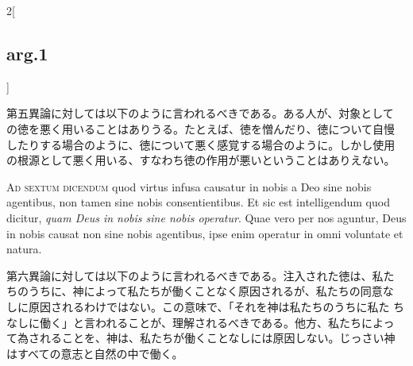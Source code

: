 \documentclass[paper=a4paper,fontsize=10pt,jafontsize=9pt,titlepage]{jlreq}
\begin{document}
\begin{paracol}{2}[\subsection{arg.1}]
\switchcolumn

第五異論に対しては以下のように言われるべきである。ある人が、対象として
の徳を悪く用いることはありうる。たとえば、徳を憎んだり、徳について自慢
したりする場合のように、徳について悪く感覚する場合のように。しかし使用
の根源として悪く用いる、すなわち徳の作用が悪いということはありえない。

\switchcolumn*[\subsection{ad.6}]

{\scshape Ad sextum dicendum} quod virtus infusa causatur in nobis a
Deo sine nobis agentibus, non tamen sine nobis consentientibus. Et sic
est intelligendum quod dicitur, {\itshape quam Deus in nobis sine
nobis operatur}. Quae vero per nos aguntur, Deus in nobis causat non
sine nobis agentibus, ipse enim operatur in omni voluntate et natura.

\switchcolumn

第六異論に対しては以下のように言われるべきである。注入された徳は、私た
ちのうちに、神によって私たちが働くことなく原因されるが、私たちの同意な
しに原因されるわけではない。この意味で、「それを神は私たちのうちに私た
ちなしに働く」と言われることが、理解されるべきである。他方、私たちによっ
て為されることを、神は、私たちが働くことなしには原因しない。じっさい神
はすべての意志と自然の中で働く。

\end{paracol}
\end{document}
